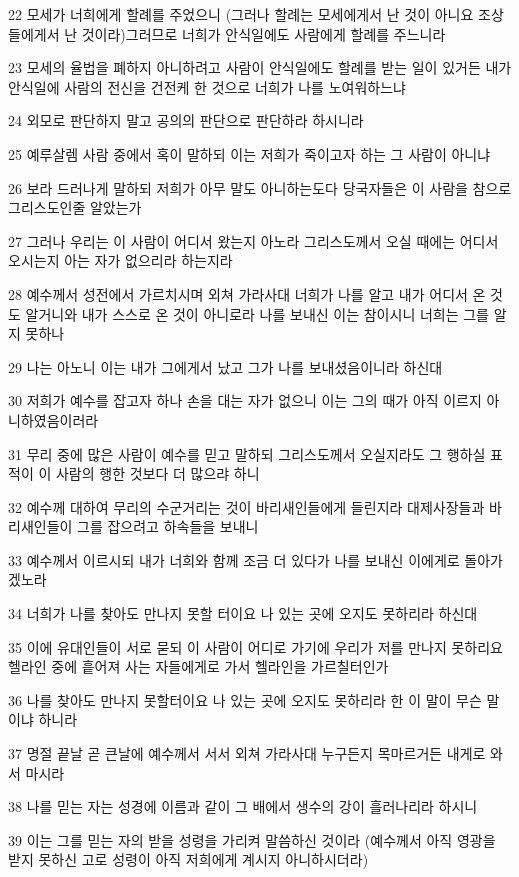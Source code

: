\par 22 모세가 너희에게 할례를 주었으니 (그러나 할례는 모세에게서 난 것이 아니요 조상들에게서 난 것이라)그러므로 너희가 안식일에도 사람에게 할례를 주느니라
\par 23 모세의 율법을 폐하지 아니하려고 사람이 안식일에도 할례를 받는 일이 있거든 내가 안식일에 사람의 전신을 건전케 한 것으로 너희가 나를 노여워하느냐
\par 24 외모로 판단하지 말고 공의의 판단으로 판단하라 하시니라
\par 25 예루살렘 사람 중에서 혹이 말하되 이는 저희가 죽이고자 하는 그 사람이 아니냐
\par 26 보라 드러나게 말하되 저희가 아무 말도 아니하는도다 당국자들은 이 사람을 참으로 그리스도인줄 알았는가
\par 27 그러나 우리는 이 사람이 어디서 왔는지 아노라 그리스도께서 오실 때에는 어디서 오시는지 아는 자가 없으리라 하는지라
\par 28 예수께서 성전에서 가르치시며 외쳐 가라사대 너희가 나를 알고 내가 어디서 온 것도 알거니와 내가 스스로 온 것이 아니로라 나를 보내신 이는 참이시니 너희는 그를 알지 못하나
\par 29 나는 아노니 이는 내가 그에게서 났고 그가 나를 보내셨음이니라 하신대
\par 30 저희가 예수를 잡고자 하나 손을 대는 자가 없으니 이는 그의 때가 아직 이르지 아니하였음이러라
\par 31 무리 중에 많은 사람이 예수를 믿고 말하되 그리스도께서 오실지라도 그 행하실 표적이 이 사람의 행한 것보다 더 많으랴 하니
\par 32 예수께 대하여 무리의 수군거리는 것이 바리새인들에게 들린지라 대제사장들과 바리새인들이 그를 잡으려고 하속들을 보내니
\par 33 예수께서 이르시되 내가 너희와 함께 조금 더 있다가 나를 보내신 이에게로 돌아가겠노라
\par 34 너희가 나를 찾아도 만나지 못할 터이요 나 있는 곳에 오지도 못하리라 하신대
\par 35 이에 유대인들이 서로 묻되 이 사람이 어디로 가기에 우리가 저를 만나지 못하리요 헬라인 중에 흩어져 사는 자들에게로 가서 헬라인을 가르칠터인가
\par 36 나를 찾아도 만나지 못할터이요 나 있는 곳에 오지도 못하리라 한 이 말이 무슨 말이냐 하니라
\par 37 명절 끝날 곧 큰날에 예수께서 서서 외쳐 가라사대 누구든지 목마르거든 내게로 와서 마시라
\par 38 나를 믿는 자는 성경에 이름과 같이 그 배에서 생수의 강이 흘러나리라 하시니
\par 39 이는 그를 믿는 자의 받을 성령을 가리켜 말씀하신 것이라 (예수께서 아직 영광을 받지 못하신 고로 성령이 아직 저희에게 계시지 아니하시더라)
